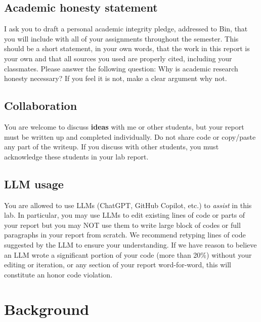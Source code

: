 \documentclass[10pt,letterpaper]{article}
\begin{document}
\subsection*{Academic honesty statement}

I ask you to draft a personal academic integrity pledge, addressed to Bin, that you will include with all of your assignments throughout the semester. This should be a short statement, in your own words, that the work in this report is your own and that all sources you used are properly cited, including your classmates. Please answer the following question: Why is academic research honesty necessary? If you feel it is not, make a clear argument why not.

\subsection*{Collaboration}

You are welcome to discuss \textbf{ideas} with me or other students, but your report must be written up and completed individually. Do not share code or copy/paste any part of the writeup. If you discuss with other students, you must acknowledge these students in your lab report.

\subsection*{LLM usage}

You are allowed to use LLMs (ChatGPT, GitHub Copilot, etc.) to \textit{assist} in this lab. In particular, you may use LLMs to edit existing lines of code or parts of your report but you may NOT use them to write large block of codes or full paragraphs in your report from scratch. We recommend retyping lines of code suggested by the LLM to ensure your understanding. If we have reason to believe an LLM wrote a significant portion of your code (more than 20\%) without your editing or iteration, or any section of your report word-for-word, this will constitute an honor code violation.

\section*{Background}
\end{document}
